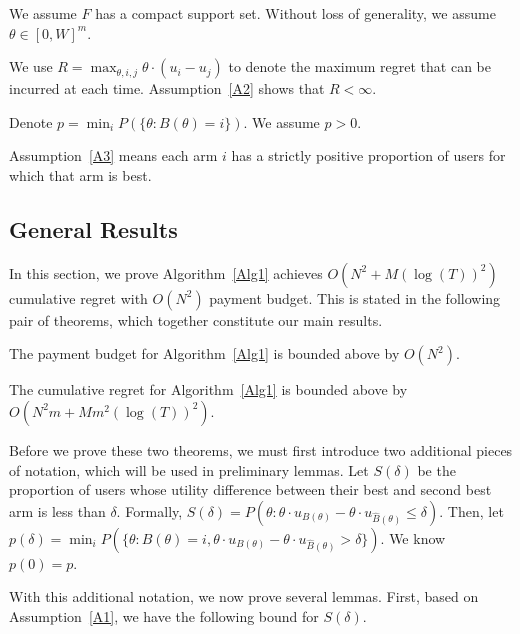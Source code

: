 \begin{assumption} We assume $F$ has a compact support set. Without loss of generality, we assume $\theta\in [0,W]^m$.
\label{A2}
\end{assumption}

We use $R = \max_{\theta, i,j} \theta \cdot (u_i - u_j)$ to denote the maximum regret that can be incurred at each time.  Assumption~\ref{A2} shows that $R<\infty$.

\begin{assumption}
Denote $p=\min_{i}P(\{\theta: B(\theta)=i\})$. We assume $p>0$.
\label{A3}
\end{assumption}

Assumption~\ref{A3} means each arm $i$ has a strictly positive proportion of users for which that arm is best. 

\subsection{General Results}

In this section, we prove Algorithm~\ref{Alg1} achieves $O(N^2+M(\log(T))^2)$ cumulative regret with $O(N^2)$ payment budget.  This is stated in the following pair of theorems, which together constitute our main results.

\begin{theorem}
The payment budget for Algorithm~\ref{Alg1} is bounded above by $O(N^2)$. 
\label{rst:budget}
\end{theorem}


\begin{theorem}
The cumulative regret for Algorithm~\ref{Alg1} is bounded above by $O(N^2 m + M m^2(\log(T))^2)$.
\label{rst:regret}
\end{theorem}



Before we prove these two theorems, we must first introduce two additional pieces of notation, which will be used in preliminary lemmas.  Let $S(\delta)$ be the proportion of users whose utility difference between their best and second best arm is less than $\delta$. Formally, $S(\delta)=P(\theta: \theta \cdot u_{B(\theta)}-\theta\cdot u_{\hat{B}(\theta)}\leq \delta)$. Then, let $p(\delta)=\min_{i}P(\{\theta:B(\theta)=i,\theta\cdot u_{B(\theta)}-\theta\cdot u_{\hat{B}(\theta)}>\delta\})$. We know $p(0)=p$. 

With this additional notation, we now prove several lemmas.
First, based on Assumption~\ref{A1}, we have the following bound for $S(\delta)$.

